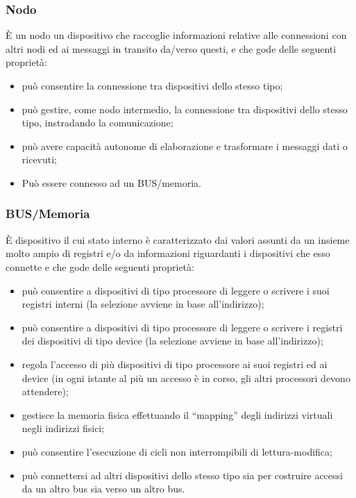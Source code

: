 \subsubsection{Nodo}
\uppercase{è} un nodo un dispositivo che raccoglie informazioni relative alle connessioni con altri nodi ed ai messaggi in transito da/verso questi, e che gode delle seguenti proprietà:

\begin{itemize}
    \item può consentire la connessione tra dispositivi dello stesso tipo;
    \item può gestire, come nodo intermedio, la connessione tra dispositivi dello stesso tipo, instradando la comunicazione;
    \item può avere capacità autonome di elaborazione e trasformare i messaggi dati o ricevuti;
    \item Può essere connesso ad un BUS/memoria.
\end{itemize}

\subsubsection{BUS/Memoria}
\uppercase{è} dispositivo il cui stato interno è caratterizzato dai valori assunti da un insieme molto ampio di registri e/o da informazioni riguardanti i dispositivi  che esso connette e che gode delle seguenti proprietà:

\begin{itemize}
    \item può consentire a dispositivi di tipo processore di leggere o scrivere i suoi registri interni (la selezione avviene in base all'indirizzo);
    \item può consentire a dispositivi di tipo processore di leggere o scrivere i registri dei dispositivi di tipo device (la selezione avviene in base all'indirizzo);
    \item regola l'accesso di più dispositivi di tipo processore ai suoi registri ed ai device (in ogni istante al più un accesso è in corso, gli altri processori devono attendere);
    \item  gestisce la memoria fisica effettuando il “mapping” degli indirizzi virtuali negli indirizzi fisici;
    \item può consentire l'esecuzione di cicli non interrompibili di lettura-modifica;
    \item può connettersi ad altri dispositivi dello stesso tipo sia per costruire accessi da un altro bus sia verso un altro bus.
\end{itemize}


